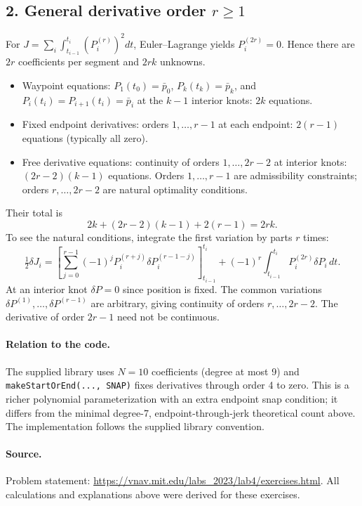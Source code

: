 \documentclass[11pt]{article}
\begin{document}
\subsection*{2. General derivative order $r\geq1$}
For $J=\sum_i\int_{t_{i-1}}^{t_i}(P_i^{(r)})^2dt$,
Euler--Lagrange yields $P_i^{(2r)}=0$. Hence there are $2r$ coefficients
per segment and $2rk$ unknowns.
\begin{itemize}
\item Waypoint equations: $P_1(t_0)=\bar p_0$, $P_k(t_k)=\bar p_k$,
and $P_i(t_i)=P_{i+1}(t_i)=\bar p_i$ at the $k-1$ interior knots: $2k$ equations.
\item Fixed endpoint derivatives: orders $1,\ldots,r-1$ at each endpoint:
$2(r-1)$ equations (typically all zero).
\item Free derivative equations: continuity of orders $1,\ldots,2r-2$ at
interior knots: $(2r-2)(k-1)$ equations. Orders $1,\ldots,r-1$ are
admissibility constraints; orders $r,\ldots,2r-2$ are natural optimality conditions.
\end{itemize}
Their total is
\[
\boxed{2k+(2r-2)(k-1)+2(r-1)=2rk.}
\]
To see the natural conditions, integrate the first variation by parts $r$ times:
\[
\tfrac12\delta J_i=
\left[\sum_{j=0}^{r-1}(-1)^jP_i^{(r+j)}\delta P_i^{(r-1-j)}\right]_{t_{i-1}}^{t_i}
+(-1)^r\int_{t_{i-1}}^{t_i}P_i^{(2r)}\delta P_i\,dt.
\]
At an interior knot $\delta P=0$ since position is fixed. The common variations
$\delta P^{(1)},\ldots,\delta P^{(r-1)}$ are arbitrary, giving continuity of orders
$r,\ldots,2r-2$. The derivative of order $2r-1$ need not be continuous.

\paragraph{Relation to the code.}
The supplied library uses $N=10$ coefficients (degree at most 9) and
\texttt{makeStartOrEnd(..., SNAP)} fixes derivatives through order 4 to zero.
This is a richer polynomial parameterization with an extra endpoint snap condition;
it differs from the minimal degree-7, endpoint-through-jerk theoretical count above.
The implementation follows the supplied library convention.
\paragraph{Source.}
Problem statement: \url{https://vnav.mit.edu/labs_2023/lab4/exercises.html}.
All calculations and explanations above were derived for these exercises.
\end{document}
